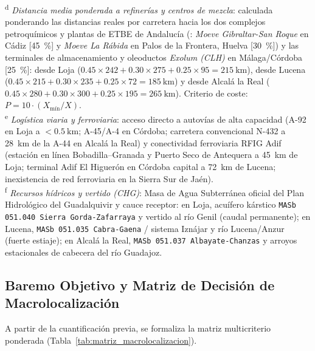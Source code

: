 \documentclass{report}
\begin{document}
\begin{table}[H]
{    \textsuperscript{d} \textit{Distancia media ponderada a refinerías y centros de mezcla}: calculada ponderando las distancias reales por carretera hacia los dos complejos petroquímicos y plantas de ETBE de Andalucía (\textcite[Sección~10.2 y Anexo~6]{AAE2026}: \textit{Moeve Gibraltar-San Roque} en Cádiz [\SI{45}{\percent}] y \textit{Moeve La Rábida} en Palos de la Frontera, Huelva [\SI{30}{\percent}]) y las terminales de almacenamiento y oleoductos \textit{Exolum (CLH)} en Málaga/Córdoba [\SI{25}{\percent}]: desde Loja ($0.45 \times 242 + 0.30 \times 275 + 0.25 \times 95 = \SI{215}{\kilo\metre}$), desde Lucena ($0.45 \times 215 + 0.30 \times 235 + 0.25 \times 72 = \SI{185}{\kilo\metre}$) y desde Alcalá la Real ($0.45 \times 280 + 0.30 \times 300 + 0.25 \times 195 = \SI{265}{\kilo\metre}$). Criterio de coste: $P = 10 \cdot (X_{\text{mín}} / X)$.\\
    \textsuperscript{e} \textit{Logística viaria y ferroviaria}: acceso directo a autovías de alta capacidad (A-92 en Loja a $<\SI{0.5}{\kilo\metre}$; A-45/A-4 en Córdoba; carretera convencional N-432 a \SI{28}{\kilo\metre} de la A-44 en Alcalá la Real) y conectividad ferroviaria RFIG Adif (estación en línea Bobadilla--Granada y Puerto Seco de Antequera a \SI{45}{\kilo\metre} de Loja; terminal Adif El Higuerón en Córdoba capital a \SI{72}{\kilo\metre} de Lucena; inexistencia de red ferroviaria en la Sierra Sur de Jaén).\\
    \textsuperscript{f} \textit{Recursos hídricos y vertido (CHG)}: Masa de Agua Subterránea oficial del Plan Hidrológico del Guadalquivir y cauce receptor: en Loja, acuífero kárstico \texttt{MASb 051.040 Sierra Gorda-Zafarraya} y vertido al río Genil (caudal permanente); en Lucena, \texttt{MASb 051.035 Cabra-Gaena} / sistema Iznájar y río Lucena/Anzur (fuerte estiaje); en Alcalá la Real, \texttt{MASb 051.037 Albayate-Chanzas} y arroyos estacionales de cabecera del río Guadajoz.}
\end{table}

\subsection{Baremo Objetivo y Matriz de Decisión de Macrolocalización}
A partir de la cuantificación previa, se formaliza la matriz multicriterio ponderada (Tabla~\ref{tab:matriz_macrolocalizacion}).
\end{document}

